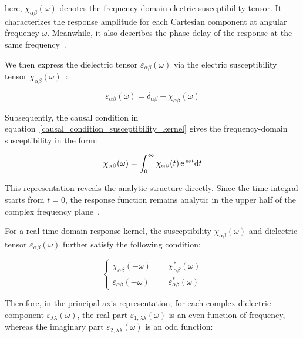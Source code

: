here, $\chi_{\alpha\beta}(\omega)$ denotes the frequency-domain electric susceptibility tensor.
It characterizes the response amplitude for each Cartesian component at angular frequency $\omega$.
Meanwhile, it also describes the phase delay of the response at the same frequency~\cite{koutserimpas2024time}.

We then express the dielectric tensor $\varepsilon_{\alpha\beta}(\omega)$ via the electric susceptibility tensor $\chi_{\alpha\beta}(\omega)$~\cite{franta2020symmetry}:

\begin{equation}
    \varepsilon_{\alpha\beta}(\omega) =
    \delta_{\alpha\beta}
    + \chi_{\alpha\beta}(\omega)
\label{dielectric_tensor_from_susceptibility}
\end{equation}

Subsequently, the causal condition in equation~\eqref{causal_condition_susceptibility_kernel}
gives the frequency-domain susceptibility in the form:

\begin{equation}
\chi_{\alpha\beta}(\omega) =
    \int_{0}^{\infty}
    \chi_{\alpha\beta}(t)
    \,\mathrm{e}^{\,\mathrm{i}\omega t}
    \mathrm{d}{t}
\label{frequency_domain_susceptibility_from_causality}
\end{equation}

This representation reveals the analytic structure directly.
Since the time integral starts from $t=0$, the response function remains analytic in the upper half of the complex frequency plane~\cite{nussenzveig1972causality}.

For a real time-domain response kernel, the susceptibility $\chi_{\alpha\beta}(\omega)$
and dielectric tensor $\varepsilon_{\alpha\beta}(\omega)$ further satisfy the following condition:

\begin{equation}
\left\{\begin{aligned}
    \chi_{\alpha\beta}(-\omega)
    &= \chi_{\alpha\beta}^{*}(\omega) \\
    \varepsilon_{\alpha\beta}(-\omega)
    &= \varepsilon_{\alpha\beta}^{*}(\omega)
\end{aligned}\right.
\label{reality_condition_response_functions}
\end{equation}

Therefore, in the principal-axis representation,
for each complex dielectric component $\varepsilon_{\lambda\lambda}(\omega)$,
the real part $\varepsilon_{1,\lambda\lambda}(\omega)$ is an even function of frequency,
whereas the imaginary part $\varepsilon_{2,\lambda\lambda}(\omega)$ is an odd function:

